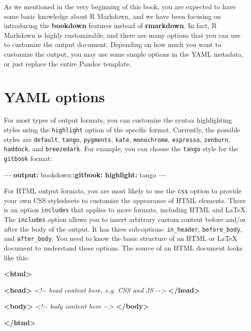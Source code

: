 \documentclass[
  12pt,
]{krantz}
\newenvironment{Shaded}{\begin{snugshade}}{\end{snugshade}}
\newcommand{\AttributeTok}[1]{\textcolor[rgb]{0.13,0.29,0.53}{#1}}
\newcommand{\CommentTok}[1]{\textcolor[rgb]{0.56,0.35,0.01}{\textit{#1}}}
\newcommand{\FunctionTok}[1]{\textcolor[rgb]{0.13,0.29,0.53}{\textbf{#1}}}
\newcommand{\KeywordTok}[1]{\textcolor[rgb]{0.13,0.29,0.53}{\textbf{#1}}}
\newcommand{\PreprocessorTok}[1]{\textcolor[rgb]{0.56,0.35,0.01}{\textit{#1}}}
\begin{document}
As we mentioned in the very beginning of this book, you are expected to have some basic knowledge about R Markdown, and we have been focusing on introducing the \textbf{bookdown} features instead of \textbf{rmarkdown}. In fact, R Markdown is highly customizable, and there are many options that you can use to customize the output document. Depending on how much you want to customize the output, you may use some simple options in the YAML metadata, or just replace the entire Pandoc template.

\hypertarget{yaml-options}{%
\section{YAML options}\label{yaml-options}}

For most types of output formats, you can customize the syntax highlighting styles using the \texttt{highlight} option of the specific format. Currently, the possible styles are \texttt{default}, \texttt{tango}, \texttt{pygments}, \texttt{kate}, \texttt{monochrome}, \texttt{espresso}, \texttt{zenburn}, \texttt{haddock}, and \texttt{breezedark}. For example, you can choose the \texttt{tango} style for the \texttt{gitbook} format:

\begin{Shaded}
\begin{Highlighting}[]
\PreprocessorTok{{-}{-}{-}}
\FunctionTok{output}\KeywordTok{:}
\AttributeTok{  bookdown:}\FunctionTok{:gitbook}\KeywordTok{:}
\AttributeTok{    }\FunctionTok{highlight}\KeywordTok{:}\AttributeTok{ tango}
\PreprocessorTok{{-}{-}{-}}
\end{Highlighting}
\end{Shaded}

For HTML output formats, you are most likely to use the \texttt{css} option to provide your own CSS stylesheets to customize the appearance of HTML elements. There is an option \texttt{includes} that applies to more formats, including HTML and LaTeX. The \texttt{includes} option allows you to insert arbitrary custom content before and/or after the body of the output. It has three sub-options: \texttt{in\_header}, \texttt{before\_body}, and \texttt{after\_body}. You need to know the basic structure of an HTML or LaTeX document to understand these options. The source of an HTML document looks like this:

\begin{Shaded}
\begin{Highlighting}[]
\KeywordTok{\textless{}html\textgreater{}}
  
  \KeywordTok{\textless{}head\textgreater{}}
  \CommentTok{\textless{}!{-}{-} head content here, e.g. CSS and JS {-}{-}\textgreater{}}
  \KeywordTok{\textless{}/head\textgreater{}}
  
  \KeywordTok{\textless{}body\textgreater{}}
  \CommentTok{\textless{}!{-}{-} body content here {-}{-}\textgreater{}}
  \KeywordTok{\textless{}/body\textgreater{}}

\KeywordTok{\textless{}/html\textgreater{}}
\end{Highlighting}
\end{Shaded}
\end{document}
